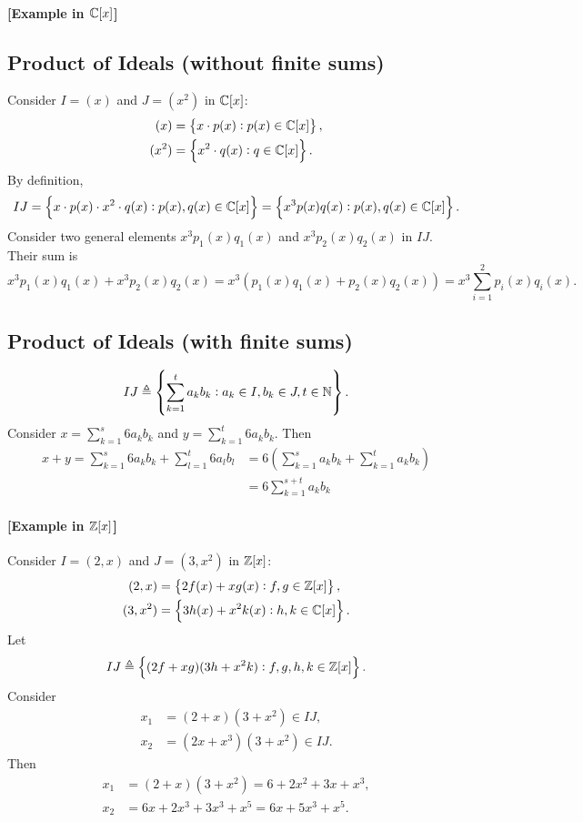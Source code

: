 \documentclass[11pt,openany]{article}
\begin{document}
	\paragraph{[Example in $\mathbb{C}[x]$]}
	\subsection*{Product of Ideals (without finite sums)}
	Consider $I=(x)$ and $J=(x^2)$ in $\mathbb{C}[x]$: \begin{align*}
		(x)&=\set{x\cdot p(x):p(x)\in\mathbb{C}[x]},\\
		(x^2)&=\set{x^2\cdot q(x):q\in\mathbb{C}[x]}.
	\end{align*} By definition, \[
	IJ=\set{x\cdot p(x)\cdot x^2\cdot q(x):p(x),q(x)\in\mathbb{C}[x]}=\set{x^3p(x)q(x):p(x),q(x)\in\mathbb{C}[x]}.
	\] Consider two general elements $x^3p_1(x)q_1(x)$ and $x^3p_2(x)q_2(x)$ in $IJ$.
	Their sum is \[
	x^3p_1(x)q_1(x)+x^3p_2(x)q_2(x)=x^3(p_1(x)q_1(x)+p_2(x)q_2(x))=x^3\sum_{i=1}^2p_i(x)q_i(x).
	\]
	\subsection*{Product of Ideals (with finite sums)}
	\[
	IJ\triangleq\set{\sum_{k=1}^ta_kb_k:a_k\in I,b_k\in J,t\in\mathbb{N}}.
	\] Consider $x=\sum_{k=1}^s6a_kb_k$ and $y=\sum_{k=1}^t6a_kb_k$. Then \begin{align*}
		x+y=\sum_{k=1}^s6a_kb_k+\sum_{l=1}^t6a_lb_l&=6\left(\sum_{k=1}^sa_kb_k+\sum_{k=1}^ta_kb_k\right)
		\\&=6\sum_{k=1}^{s+t}a_kb_k
	\end{align*}
	
	\newpage
	\paragraph{[Example in $\mathbb{Z}[x]$]}
	Consider $I=(2,x)$ and $J=(3,x^2)$ in $\mathbb{Z}[x]$: \begin{align*}
		(2,x)&=\set{2f(x)+xg(x):f,g\in\mathbb{Z}[x]},\\
		(3,x^2)&=\set{3h(x)+x^2k(x):h,k\in\mathbb{C}[x]}.
	\end{align*} Let \[
	IJ\triangleq\set{(2f+xg)(3h+x^2k):f,g,h,k\in\mathbb{Z}[x]}.
	\] Consider \begin{align*}
		x_1&=(2+x)(3+x^2)\in IJ,\\
		x_2&=(2x+x^3)(3+x^2)\in IJ.
	\end{align*} Then \begin{align*}
	x_1&=(2+x)(3+x^2)=6+2x^2+3x+x^3,\\
	x_2&=6x+2x^3+3x^3+x^5=6x+5x^3+x^5.
\end{align*}
	
\end{document}
